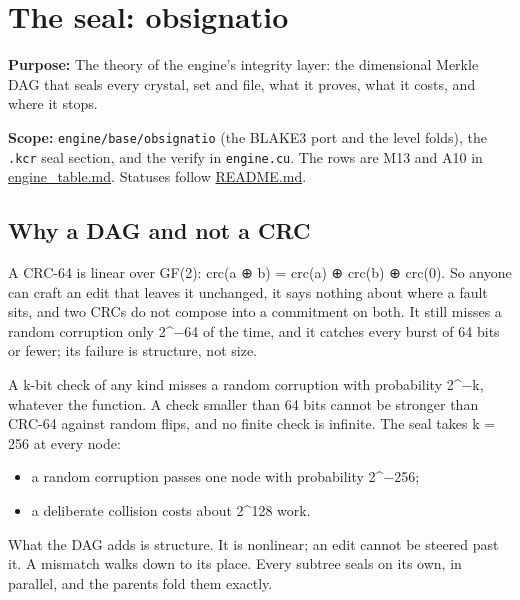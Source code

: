 \chapter{\texorpdfstring{The seal: obsignatio}{The seal: obsignatio}}
\label{chap:obsignatio-seal}

\textbf{Purpose:} The theory of the engine's integrity layer: the dimensional Merkle DAG that seals every crystal, set and file, what it proves, what it costs, and where it stops.

\textbf{Scope:} \texttt{engine/\allowbreak{}base/\allowbreak{}obsignatio} (the BLAKE3 port and the level folds), the \texttt{.\allowbreak{}kcr} seal section, and the verify in \texttt{engine.\allowbreak{}cu}. The rows are M13 and A10 in \hyperref[chap:engine-table]{engine\_\allowbreak{}table.md}. Statuses follow \hyperref[chap:readme]{README.md}.

\section{\texorpdfstring{Why a DAG and not a CRC}{Why a DAG and not a CRC}}

A CRC-64 is linear over GF(2): crc(a ⊕ b) = crc(a) ⊕ crc(b) ⊕ crc(0). So anyone can craft an edit that leaves it unchanged, it says nothing about where a fault sits, and two CRCs do not compose into a commitment on both. It still misses a random corruption only 2\textasciicircum{}−64 of the time, and it catches every burst of 64 bits or fewer; its failure is structure, not size.

A k-bit check of any kind misses a random corruption with probability 2\textasciicircum{}−k, whatever the function. A check smaller than 64 bits cannot be stronger than CRC-64 against random flips, and no finite check is infinite. The seal takes k = 256 at every node:

\begin{itemize}
\item a random corruption passes one node with probability 2\textasciicircum{}−256;
\item a deliberate collision costs about 2\textasciicircum{}128 work.
\end{itemize}

What the DAG adds is structure. It is nonlinear; an edit cannot be steered past it. A mismatch walks down to its place. Every subtree seals on its own, in parallel, and the parents fold them exactly.

